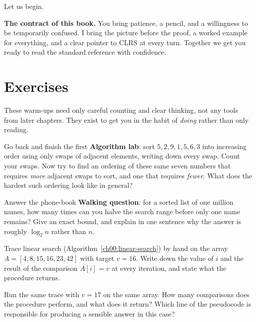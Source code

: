Let us begin.

\begin{focusbox}
\textbf{The contract of this book.} You bring patience, a pencil, and a
willingness to be temporarily confused. I bring the picture before the proof, a
worked example for everything, and a clear pointer to CLRS at every turn.
Together we get you ready to read the standard reference with confidence.
\end{focusbox}

\section*{Exercises}

These warm-ups need only careful counting and clear thinking, not any tools
from later chapters. They exist to get you in the habit of \emph{doing}
rather than only reading.

\begin{exercise}
Go back and finish the first \textbf{Algorithm lab}: sort $5, 2, 9, 1, 5, 6, 3$
into increasing order using only swaps of adjacent elements, writing down every
swap. Count your swaps. Now try to find an ordering of these same seven numbers
that requires \emph{more} adjacent swaps to sort, and one that requires
\emph{fewer}. What does the hardest such ordering look like in general?
\end{exercise}

\begin{exercise}
Answer the phone-book \textbf{Walking question}: for a sorted list of one million
names, how many times can you halve the search range before only one name remains?
Give an exact bound, and explain in one sentence why the answer is roughly
$\log_2 n$ rather than $n$.
\end{exercise}

\begin{exercise}
Trace linear search (Algorithm~\ref{ch00:linear-search}) by hand on the array
$A = [4, 8, 15, 16, 23, 42]$ with target $v = 16$. Write down the value of $i$ and
the result of the comparison $A[i] = v$ at every iteration, and state what the
procedure returns.
\end{exercise}

\begin{exercise}
Run the same trace with $v = 17$ on the same array. How many comparisons does the
procedure perform, and what does it return? Which line of the pseudocode is
responsible for producing a sensible answer in this case?
\end{exercise}

